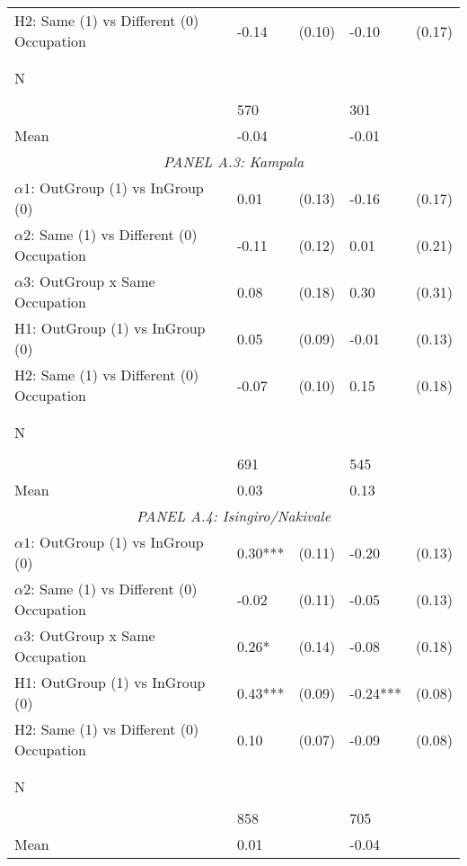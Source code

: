 \begin{tabular}{l*{4}{l}}
H2: Same (1) vs Different (0) Occupation&    -0.14   &   (0.10)&    -0.10   &   (0.17)\\
 
  \\\\[-0.5cm] N \\\\[-0.6cm]&      570   &         &      301   &         \\
Mean            &    -0.04&         &    -0.01&         \\
 
  \multicolumn{5}{c}{\textit{PANEL A.3: Kampala}} \\  \midrule  
$\alpha1$: OutGroup (1) vs InGroup (0)&        0.01   &      (0.13)&       -0.16   &      (0.17)\\
$\alpha2$: Same (1) vs Different (0) Occupation&       -0.11   &      (0.12)&        0.01   &      (0.21)\\
 
$\alpha3$: OutGroup x Same Occupation&     0.08   &   (0.18)&     0.30   &   (0.31)\\
 
H1: OutGroup (1) vs InGroup (0)&     0.05   &   (0.09)&    -0.01   &   (0.13)\\
 
H2: Same (1) vs Different (0) Occupation&    -0.07   &   (0.10)&     0.15   &   (0.18)\\
 
  \\\\[-0.5cm] N \\\\[-0.6cm]&      691   &         &      545   &         \\
Mean            &     0.03&         &     0.13&         \\
 
  \multicolumn{5}{c}{\textit{PANEL A.4: Isingiro/Nakivale}} \\  \midrule   
$\alpha1$: OutGroup (1) vs InGroup (0)&        0.30***&      (0.11)&       -0.20   &      (0.13)\\
$\alpha2$: Same (1) vs Different (0) Occupation&       -0.02   &      (0.11)&       -0.05   &      (0.13)\\
 
$\alpha3$: OutGroup x Same Occupation&     0.26*  &   (0.14)&    -0.08   &   (0.18)\\
 
H1: OutGroup (1) vs InGroup (0)&     0.43***&   (0.09)&    -0.24***&   (0.08)\\
 
H2: Same (1) vs Different (0) Occupation&     0.10   &   (0.07)&    -0.09   &   (0.08)\\
 
  \\\\[-0.5cm] N \\\\[-0.6cm]&      858   &         &      705   &         \\
Mean            &     0.01&         &    -0.04&         \\
 
\bottomrule  \end{tabular}  
